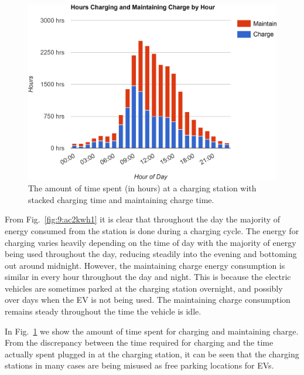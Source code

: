 \begin{figure}[H]
	\centering
	\includegraphics[width=0.8\linewidth]{ac2hours1}
	\caption[Amount of time spent at a charging station]{The amount of time spent (in hours) at a charging station with stacked charging time and maintaining charge time.}
	\label{fig:9:ac2hours1}
\end{figure}

From Fig.~\ref{fig:9:ac2kwh1} it is clear that throughout the day the majority of energy consumed from the station is done during a charging cycle. The energy for charging varies heavily depending on the time of day with the majority of energy being used throughout the day, reducing steadily into the evening and bottoming out around midnight. However, the maintaining charge energy consumption is similar in every hour throughout the day and night. This is because the electric vehicles are sometimes parked at the charging station overnight, and possibly over days when the EV is not being used. The maintaining charge consumption remains steady throughout the time the vehicle is idle.

In Fig.~\ref{fig:9:ac2hours1} we show the amount of time spent for charging and maintaining charge. From the discrepancy between the time required for charging and the time actually spent plugged in at the charging station, it can be seen that the charging stations in many cases are being misused as free parking locations for EVs. 

